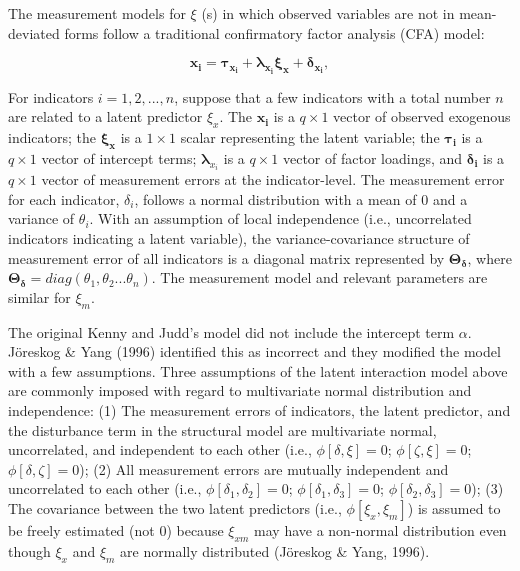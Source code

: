 \documentclass[
  man]{apa7}
\begin{document}
The measurement models for \(\xi\) (s) in which observed variables are not in mean-deviated forms follow a traditional confirmatory factor analysis (CFA) model:

\begin{equation}
\mathbf{x_{i}} = \boldsymbol{\tau_{x_{i}}} + \boldsymbol{\lambda_{x_{i}}\xi_{x}} + \boldsymbol{\delta_{x_{i}}},
\end{equation}

For indicators \(i = 1, 2, ..., n\), suppose that a few indicators with a total number \(n\) are related to a latent predictor \(\xi_{x}\). The \(\mathbf{x_{i}}\) is a \(q \times 1\) vector of observed exogenous indicators; the \(\boldsymbol{\xi_{x}}\) is a \(1 \times 1\) scalar representing the latent variable; the \(\boldsymbol{{\tau_{i}}}\) is a \(q \times 1\) vector of intercept terms; \(\boldsymbol{\lambda}_{x_{i}}\) is a \(q \times 1\) vector of factor loadings, and \(\boldsymbol{\delta_{i}}\) is a \(q \times 1\) vector of measurement errors at the indicator-level. The measurement error for each indicator, \(\delta_{i}\), follows a normal distribution with a mean of 0 and a variance of \(\theta_{i}\). With an assumption of local independence (i.e., uncorrelated indicators indicating a latent variable), the variance-covariance structure of measurement error of all indicators is a diagonal matrix represented by \(\mathbf{\Theta_{\delta}}\), where \(\mathbf{\Theta_{\delta}} = diag(\theta_{1}, \theta_{2}... \theta_{n})\). The measurement model and relevant parameters are similar for \(\xi_{m}\).

The original Kenny and Judd's model did not include the intercept term \(\alpha\). Jöreskog \& Yang (1996) identified this as incorrect and they modified the model with a few assumptions. Three assumptions of the latent interaction model above are commonly imposed with regard to multivariate normal distribution and independence: (1) The measurement errors of indicators, the latent predictor, and the disturbance term in the structural model are multivariate normal, uncorrelated, and independent to each other (i.e., \(\phi[\delta, \xi] = 0\); \(\phi[\zeta, \xi] = 0\); \(\phi[\delta, \zeta] = 0\)); (2) All measurement errors are mutually independent and uncorrelated to each other (i.e., \(\phi[\delta_{1}, \delta_{2}] = 0\); \(\phi[\delta_{1}, \delta_{3}] = 0\); \(\phi[\delta_{2}, \delta_{3}] = 0\)); (3) The covariance between the two latent predictors (i.e., \(\phi[\xi_{x}, \xi_{m}]\)) is assumed to be freely estimated (not 0) because \(\xi_{xm}\) may have a non-normal distribution even though \(\xi_{x}\) and \(\xi_{m}\) are normally distributed (Jöreskog \& Yang, 1996).
\end{document}
